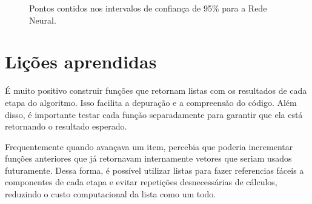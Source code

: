 \documentclass[
  a4paperpaper,
]{article}
\begin{document}
\begin{figure}[H]


\caption{\label{fig-intervaloconfiancarede}Pontos contidos nos
intervalos de confiança de 95\% para a Rede Neural.}

\end{figure}%

\section{Lições aprendidas}\label{liuxe7uxf5es-aprendidas}

É muito positivo construir funções que retornam listas com os resultados
de cada etapa do algoritmo. Isso facilita a depuração e a compreensão do
código. Além disso, é importante testar cada função separadamente para
garantir que ela está retornando o resultado esperado.

Frequentemente quando avançava um item, percebia que poderia incrementar
funções anteriores que já retornavam internamente vetores que seriam
usados futuramente. Dessa forma, é possível utilizar listas para fazer
referencias fáceis a componentes de cada etapa e evitar repetições
desnecessárias de cálculos, reduzindo o custo computacional da lista
como um todo.
\end{document}
